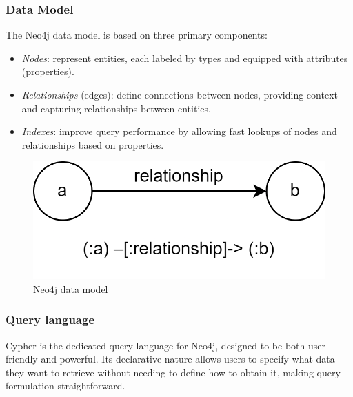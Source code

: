 \subsubsection{Data Model}
The Neo4j data model is based on three primary components:
\begin{itemize}
    \item \textit{Nodes}: represent entities, each labeled by types and equipped with attributes (properties).
    \item \textit{Relationships} (edges): define connections between nodes, providing context and capturing relationships between entities.
    \item \textit{Indexes}: improve query performance by allowing fast lookups of nodes and relationships based on properties.
\end{itemize}
\begin{figure}[H]
    \centering
    \includegraphics[width=0.50\linewidth]{images/neo4j1.png}
    \caption{Neo4j data model}
\end{figure}

\subsubsection{Query language}
Cypher is the dedicated query language for Neo4j, designed to be both user-friendly and powerful. 
Its declarative nature allows users to specify what data they want to retrieve without needing to define how to obtain it, making query formulation straightforward.

